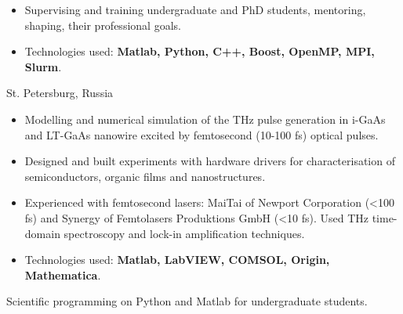 \documentclass[10pt,a4paper,ragged2e,withhyper]{altacv}
\begin{document}
\begin{paracol}{2}
\begin{itemize}
    \item
    Supervising and training undergraduate and PhD students, mentoring, shaping,
    their professional goals.

    \item
    Technologies used: {\bf Matlab, Python, C++, Boost, OpenMP, MPI, Slurm}.

\end{itemize}

\divider

{St. Petersburg, Russia}

\begin{itemize}

    \item
    Modelling and numerical simulation of the THz pulse generation in i-GaAs
    and LT-GaAs nanowire excited by femtosecond (10-100 fs) optical pulses.

    \item
    Designed and built experiments with hardware drivers for
    characterisation of semiconductors, organic films and nanostructures.
    
    \item
    Experienced with femtosecond lasers: MaiTai of Newport Corporation (<100 fs)
    and Synergy of Femtolasers Produktions GmbH (<10 fs).
    Used THz time-domain spectroscopy and lock-in amplification techniques.

    \item
    Technologies used: {\bf Matlab, LabVIEW, COMSOL, Origin, Mathematica}.

\end{itemize}



Scientific programming on Python and Matlab for undergraduate students.





\divider


\end{paracol}
\end{document}

